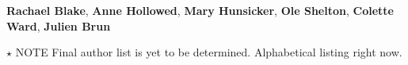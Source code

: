 \textbf{Rachael Blake}, 
\textbf{Anne Hollowed}, 
\textbf{Mary Hunsicker}, 
\textbf{Ole Shelton}, 
\textbf{Colette Ward},
\textbf{Julien Brun}


$\star$ NOTE Final author list is yet to be determined. Alphabetical listing right now. 
